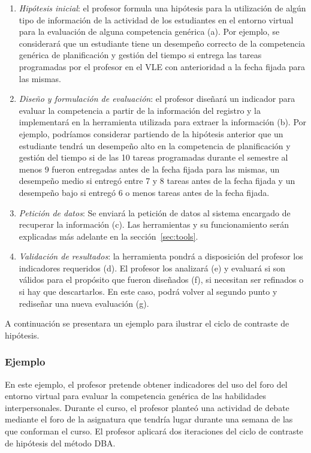 \begin{enumerate}
\item \emph{Hipótesis inicial}: el profesor formula una hipótesis para la utilización de algún tipo de información de la actividad de los estudiantes en el entorno virtual para la evaluación de alguna competencia genérica (a). Por ejemplo, se considerará que un estudiante tiene un desempeño correcto de la competencia genérica de planificación y gestión del tiempo si entrega las tareas programadas por el profesor en el VLE con anterioridad a la fecha fijada para las mismas.
\item \emph{Diseño y formulación de evaluación}: el profesor diseñará un indicador para evaluar la competencia a partir de la información del registro y la implementará en la herramienta utilizada para extraer la información (b). Por ejemplo, podríamos considerar partiendo de la hipótesis anterior que un estudiante tendrá un desempeño alto en la competencia de planificación y gestión del tiempo si de las 10 tareas programadas durante el semestre al menos 9 fueron entregadas antes de la fecha fijada para las mismas, un desempeño medio si entregó entre 7 y 8 tareas antes de la fecha fijada y un desempeño bajo si entregó 6 o menos tareas antes de la fecha fijada.
\item \emph{Petición de datos}: Se enviará la petición de datos al sistema encargado de recuperar la información (c). Las herramientas y su funcionamiento serán explicadas más adelante en la sección~\ref{sec:tools}.
\item \emph{Validación de resultados}: la herramienta pondrá a disposición del profesor los indicadores requeridos (d). El profesor los analizará (e) y evaluará si son válidos para el propósito que fueron diseñados (f), si necesitan ser refinados o si hay que descartarlos. En este caso, podrá volver al segundo punto y rediseñar una nueva evaluación (g).
\end{enumerate}

A continuación se presentara un ejemplo para ilustrar el ciclo de contraste de hipótesis. 

\subsubsection*{Ejemplo}

En este ejemplo, el profesor pretende obtener indicadores del uso del foro del entorno virtual para evaluar la competencia genérica de las habilidades interpersonales. Durante el curso, el profesor planteó una actividad de debate mediante el foro de la asignatura que tendría lugar durante una semana de las que conforman el curso. El profesor aplicará dos iteraciones del ciclo de contraste de hipótesis del método DBA.

